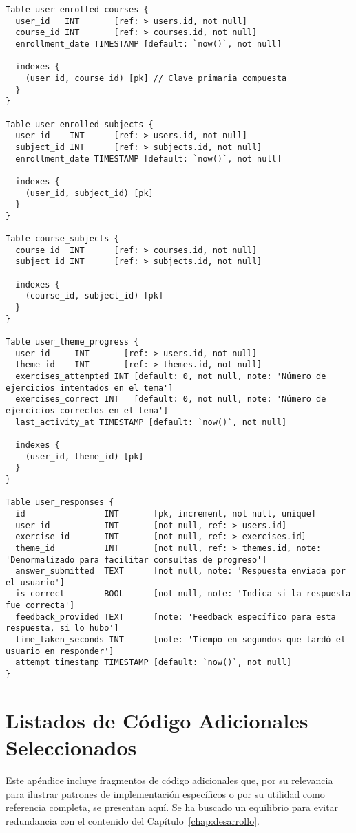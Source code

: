 \begin{lstlisting}[style=dbmlappendixstyle,
  caption={Modelo Entidad-Relación completo del sistema Tutor Virtual en formato DBML.},
  label={lst:apx_dbml_completo_contenido}
]
Table user_enrolled_courses {
  user_id   INT       [ref: > users.id, not null]
  course_id INT       [ref: > courses.id, not null]
  enrollment_date TIMESTAMP [default: `now()`, not null]
  
  indexes {
    (user_id, course_id) [pk] // Clave primaria compuesta
  }
}

Table user_enrolled_subjects {
  user_id    INT      [ref: > users.id, not null]
  subject_id INT      [ref: > subjects.id, not null]
  enrollment_date TIMESTAMP [default: `now()`, not null]
  
  indexes {
    (user_id, subject_id) [pk]
  }
}

Table course_subjects {
  course_id  INT      [ref: > courses.id, not null]
  subject_id INT      [ref: > subjects.id, not null]
  
  indexes {
    (course_id, subject_id) [pk]
  }
}

Table user_theme_progress {
  user_id     INT       [ref: > users.id, not null]
  theme_id    INT       [ref: > themes.id, not null]
  exercises_attempted INT [default: 0, not null, note: 'Número de ejercicios intentados en el tema']
  exercises_correct INT   [default: 0, not null, note: 'Número de ejercicios correctos en el tema']
  last_activity_at TIMESTAMP [default: `now()`, not null]
  
  indexes {
    (user_id, theme_id) [pk]
  }
}

Table user_responses {
  id                INT       [pk, increment, not null, unique]
  user_id           INT       [not null, ref: > users.id]
  exercise_id       INT       [not null, ref: > exercises.id]
  theme_id          INT       [not null, ref: > themes.id, note: 'Denormalizado para facilitar consultas de progreso']
  answer_submitted  TEXT      [not null, note: 'Respuesta enviada por el usuario']
  is_correct        BOOL      [not null, note: 'Indica si la respuesta fue correcta']
  feedback_provided TEXT      [note: 'Feedback específico para esta respuesta, si lo hubo']
  time_taken_seconds INT      [note: 'Tiempo en segundos que tardó el usuario en responder']
  attempt_timestamp TIMESTAMP [default: `now()`, not null]
}
\end{lstlisting}

\chapter{Listados de Código Adicionales Seleccionados}
\label{apx:codigo_adicional_seleccionado}

Este apéndice incluye fragmentos de código adicionales que, por su relevancia para ilustrar patrones de implementación específicos o por su utilidad como referencia completa, se presentan aquí. Se ha buscado un equilibrio para evitar redundancia con el contenido del Capítulo~\ref{chap:desarrollo}.

